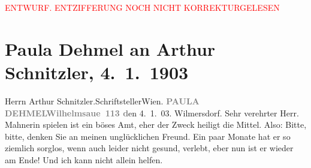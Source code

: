 
\begin{center}
            \textcolor{red}{ENTWURF. ENTZIFFERUNG NOCH NICHT KORREKTURGELESEN}
                      \end{center}
            
               \section[Paula Dehmel an Arthur Schnitzler, 4. 1. 1903]{ Paula Dehmel an Arthur Schnitzler, 4. 1. 1903}\nopagebreak{}\rehead{ }\begin{ledgroupsized}[t]{13cm}\normalsize\beginnumbering{} \toendnotes[C]{\smallbreak\pagebreak[2]} 
\toendnotes[C]{\smallbreak}\pstart{}{\pb}Herrn Arthur
                        Schnitzler.\pend{}\pstart{}Schriftsteller\pend{}\pstart{}Wien.\pend{}{\bigskip}\pstart
           {\pb}\textcolor{gray}{\textbf{PAULA DEHMEL}}\hfill \textcolor{gray}{\textbf{Wilhelmsaue 113 d}}en
                                4. 1. 03.\pend
           \pstart
           Wilmersdorf.\pend
           \pstart{}Sehr verehrter Herr.\pend\pstart
           Mahnerin spielen ist ein böses Amt, eher der Zweck heiligt die Mittel. Also:
                    Bitte, bitte, denken Sie an meinen unglücklichen Freund. Ein paar Monate hat er so ziemlich sorglos,
                    wenn auch leider nicht gesund, verlebt, eber nun ist er wieder am Ende! Und ich
                    kann nicht allein helfen.\pend
           \pstart \label{T_L01262_1v}\label{T_L01262_1h}\pend{}\endnumbering{}\end{ledgroupsized}  \newcommand{\dateiname}{L01262}\newcommand{\titel}{Paula Dehmel an Arthur Schnitzler, 4. 1. 1903}\newcommand{\editorInnen}{Martin Anton Müller und Gerd-Hermann Susen}
      